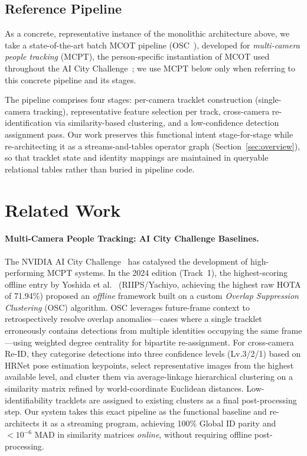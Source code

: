 \documentclass[review]{elsarticle}
\begin{document}
\subsection{Reference Pipeline}
\label{sec:background:baseline}

As a concrete, representative instance of the monolithic architecture above, we take a state-of-the-art batch MCOT pipeline (OSC~\cite{yoshida2024overlap}), developed for
\emph{multi-camera people tracking} (MCPT), the person-specific instantiation of MCOT used throughout the AI City Challenge~\cite{wang2024aicity}; we use MCPT below only when referring to this concrete pipeline and its stages.

The pipeline comprises four stages: per-camera tracklet construction (single-camera tracking), representative feature selection per track, cross-camera re-identification via similarity-based clustering, and a low-confidence detection assignment pass. Our work preserves this functional intent stage-for-stage while re-architecting it as a streams-and-tables operator graph  (Section~\ref{sec:overview}), so that tracklet state and identity mappings are maintained in queryable relational tables rather than buried in pipeline
code.

\section{Related Work}\label{sec:related}

\paragraph{Multi-Camera People Tracking: AI City Challenge Baselines.}
The NVIDIA AI City Challenge~\cite{wang2024aicity} has catalysed the development of high-performing MCPT systems. In the 2024 edition (Track~1), the highest-scoring offline entry by Yoshida et al.~\cite{yoshida2024overlap} (RIIPS/Yachiyo, achieving the highest raw HOTA of 71.94\%) proposed an \emph{offline} framework built on a custom \emph{Overlap Suppression Clustering} (OSC) algorithm. OSC leverages future-frame context to retrospectively resolve overlap anomalies---cases where a single tracklet erroneously contains detections from multiple identities occupying the same frame---using weighted degree centrality for bipartite re-assignment. For cross-camera Re-ID, they categorise detections into three confidence levels (Lv.3/2/1) based on HRNet pose estimation keypoints, select representative images from the highest available level, and cluster them via average-linkage hierarchical clustering on a similarity matrix refined by world-coordinate Euclidean distances. Low-identifiability tracklets are assigned to existing clusters as a final post-processing step. Our system takes this exact pipeline as the functional baseline and re-architects it as a streaming program, achieving 100\% Global ID parity and $<10^{-6}$ MAD in similarity matrices \emph{online}, without requiring offline post-processing.
\end{document}
